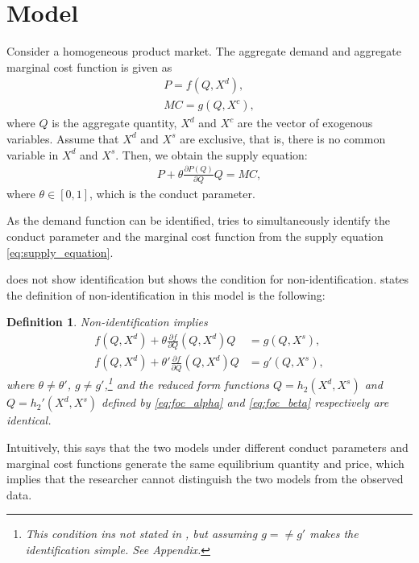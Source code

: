\documentclass[11pt, a4paper]{article}
\newtheorem{definition}{Definition}
\theoremstyle{remark}
\begin{document}
\section{Model}
Consider a homogeneous product market.
The aggregate demand and aggregate marginal cost function is given as
\begin{align}
    P = f(Q, X^{d}), \label{eq:demand}
    \\
    MC = g(Q, X^{c}),\label{eq:marginal_cost}
\end{align}
where $Q$ is the aggregate quantity, $X^{d}$ and $X^{c}$ are the vector of exogenous variables.
Assume that $X^{d}$ and $X^{s}$ are exclusive, that is, there is no common variable in $X^{d}$ and $X^{s}$.
Then, we obtain the supply equation:
\begin{align}
     P + \theta\frac{\partial P(Q)}{\partial Q}Q = MC,\label{eq:supply_equation}
\end{align}
where $\theta\in[0,1]$, which is the conduct parameter.

As the demand function can be identified, \citet{lau1982identifying} tries to simultaneously identify the conduct parameter and the marginal cost function from the supply equation \eqref{eq:supply_equation}.

\citet{lau1982identifying} does not show identification but shows the condition for non-identification.
\citet{lau1982identifying} states the definition of non-identification in this model is the following:
\begin{definition}\label{def:non_identification}
    Non-identification implies
    \begin{align}
    f(Q, X^{d}) + \theta \frac{\partial f}{\partial Q}(Q, X^{d})Q &= g(Q, X^{s}),\label{eq:foc_alpha}\\
    f(Q, X^{d}) + \theta' \frac{\partial f}{\partial Q}(Q, X^{d})Q &= g'(Q, X^{s}), \label{eq:foc_beta}
    \end{align}
    where $\theta \neq \theta'$, $g \ne g'$,\footnote{This condition ins not stated in \citet{lau1982identifying}, but assuming $g =\ne g'$ makes the identification simple. See Appendix.} and the reduced form functions $Q = h_2(X^{d}, X^{s})$ and $Q = h_2'(X^{d}, X^{s})$ defined by \eqref{eq:foc_alpha} and \eqref{eq:foc_beta} respectively are identical.
\end{definition}
Intuitively, this says that the two models under different conduct parameters and marginal cost functions generate the same equilibrium quantity and price, which implies that the researcher cannot distinguish the two models from the observed data.
\end{document}
